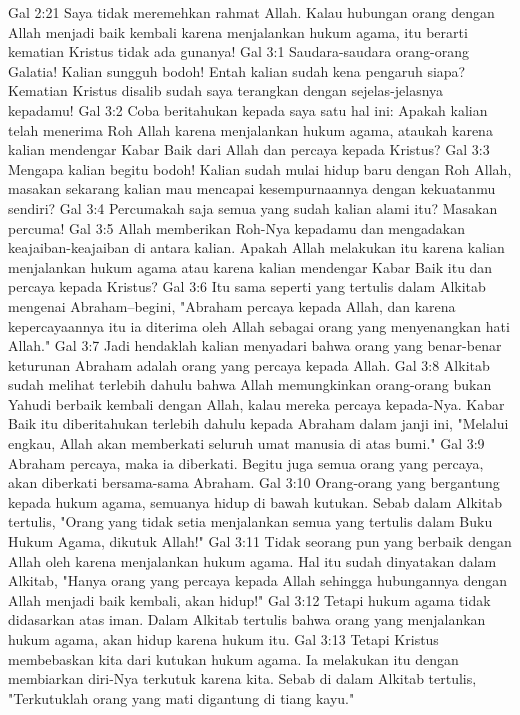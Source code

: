 Gal 2:21  Saya tidak meremehkan rahmat Allah. Kalau hubungan orang dengan Allah menjadi baik kembali karena menjalankan hukum agama, itu berarti kematian Kristus tidak ada gunanya!
Gal 3:1  Saudara-saudara orang-orang Galatia! Kalian sungguh bodoh! Entah kalian sudah kena pengaruh siapa? Kematian Kristus disalib sudah saya terangkan dengan sejelas-jelasnya kepadamu!
Gal 3:2  Coba beritahukan kepada saya satu hal ini: Apakah kalian telah menerima Roh Allah karena menjalankan hukum agama, ataukah karena kalian mendengar Kabar Baik dari Allah dan percaya kepada Kristus?
Gal 3:3  Mengapa kalian begitu bodoh! Kalian sudah mulai hidup baru dengan Roh Allah, masakan sekarang kalian mau mencapai kesempurnaannya dengan kekuatanmu sendiri?
Gal 3:4  Percumakah saja semua yang sudah kalian alami itu? Masakan percuma!
Gal 3:5  Allah memberikan Roh-Nya kepadamu dan mengadakan keajaiban-keajaiban di antara kalian. Apakah Allah melakukan itu karena kalian menjalankan hukum agama atau karena kalian mendengar Kabar Baik itu dan percaya kepada Kristus?
Gal 3:6  Itu sama seperti yang tertulis dalam Alkitab mengenai Abraham--begini, "Abraham percaya kepada Allah, dan karena kepercayaannya itu ia diterima oleh Allah sebagai orang yang menyenangkan hati Allah."
Gal 3:7  Jadi hendaklah kalian menyadari bahwa orang yang benar-benar keturunan Abraham adalah orang yang percaya kepada Allah.
Gal 3:8  Alkitab sudah melihat terlebih dahulu bahwa Allah memungkinkan orang-orang bukan Yahudi berbaik kembali dengan Allah, kalau mereka percaya kepada-Nya. Kabar Baik itu diberitahukan terlebih dahulu kepada Abraham dalam janji ini, "Melalui engkau, Allah akan memberkati seluruh umat manusia di atas bumi."
Gal 3:9  Abraham percaya, maka ia diberkati. Begitu juga semua orang yang percaya, akan diberkati bersama-sama Abraham.
Gal 3:10  Orang-orang yang bergantung kepada hukum agama, semuanya hidup di bawah kutukan. Sebab dalam Alkitab tertulis, "Orang yang tidak setia menjalankan semua yang tertulis dalam Buku Hukum Agama, dikutuk Allah!"
Gal 3:11  Tidak seorang pun yang berbaik dengan Allah oleh karena menjalankan hukum agama. Hal itu sudah dinyatakan dalam Alkitab, "Hanya orang yang percaya kepada Allah sehingga hubungannya dengan Allah menjadi baik kembali, akan hidup!"
Gal 3:12  Tetapi hukum agama tidak didasarkan atas iman. Dalam Alkitab tertulis bahwa orang yang menjalankan hukum agama, akan hidup karena hukum itu.
Gal 3:13  Tetapi Kristus membebaskan kita dari kutukan hukum agama. Ia melakukan itu dengan membiarkan diri-Nya terkutuk karena kita. Sebab di dalam Alkitab tertulis, "Terkutuklah orang yang mati digantung di tiang kayu."
